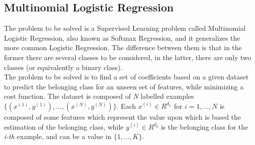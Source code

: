 \documentclass[a4paper,11pt,oneside]{book}
\begin{document}
\subsection {Multinomial Logistic Regression} \label{Subsec1.1.2}
The problem to be solved is a Supervised Learning problem called Multinomial Logistic Regression, also known as Softmax Regression, and it generalizes the more common Logistic Regression. The difference between them is that in the former there are several classes to be considered, in the latter, there are only two classes (or equivalently a binary class).\\
The problem to be solved is to find a set of coefficients based on a given dataset to predict the belonging class for an unseen set of features, while minimizing a cost function. The dataset is composed of \textit{N} labelled examples $\{(x^{(1)}, y^{(1)}), ..., (x^{(N)}, y^{(N)})\}$. Each $x^{(i)} \in R^{d_{x}}$ for $i=1, ..., N$ is composed of some features which represent the value upon which is based the estimation of the belonging class, while $y^{(i)} \in R^{d_{y}}$ is the belonging class for the \textit{i-th} example, and can be a value in $\{1, ..., K\}$.
\end{document}
